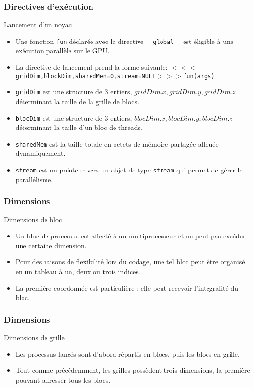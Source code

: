 \begin{frame}
    \frametitle{Directives d'exécution}
\begin{block}{Lancement d'un noyau}
    \footnotesize
    \begin{itemize}
          \item<+-> Une fonction \texttt{fun} déclarée avec la directive \texttt{\_\_global\_\_} est éligible à une exécution parallèle 
  sur le GPU.
  \item<+-> La directive de lancement prend la forme suivante:
{\footnotesize $<<<$\texttt{gridDim,blockDim,sharedMen=0,stream=NULL}$>>>$\texttt{fun(args)}}
 \item<+-> \texttt{gridDim} est une structure de 3 entiers, $gridDim.x,gridDim.y,gridDim.z$ déterminant la taille de la
 grille de blocs.
  \item<+-> \texttt{blocDim} est une structure de 3 entiers, $blocDim.x,blocDim.y,blocDim.z$ déterminant la taille d'un 
  bloc de threads.
  \item<+-> \texttt{sharedMem} est la taille totale en octets de mémoire partagée allouée dynamiquement. 
  \item<+-> \texttt{stream} est un pointeur vers un objet de type \texttt{stream} qui permet de gérer le parallélisme.

\end{itemize}

\end{block}
\end{frame}
\begin{frame}
    \frametitle{Dimensions}
\begin{block}{Dimensions de bloc}
    \begin{itemize}
          \item<+-> Un bloc de processus est affecté à un multiprocesseur et ne peut pas excéder une
          certaine dimension.
          \item<+-> Pour des raisons de flexibilité lors du codage, une tel bloc peut être organisé en 
          un tableau à un, deux ou trois indices. 
          \item<+-> La première coordonnée est particulière : elle peut recevoir l'intégralité du bloc. 
\end{itemize}
\end{block}
\end{frame}
\begin{frame}
    \frametitle{Dimensions}
\begin{block}{Dimensions de grille}
    \begin{itemize}
          \item<+-> Les processus lancés sont d'abord répartis en blocs, puis les blocs en grille.
          \item<+-> Tout comme précédemment, les grilles possèdent trois dimensions, la première pouvant 
          adresser tous les blocs.
\end{itemize}
\end{block}
\end{frame}
